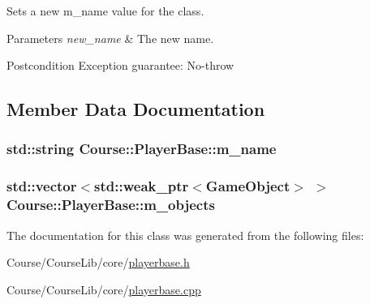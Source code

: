 Sets a new m\-\_\-name value for the class. 


\begin{DoxyParams}{Parameters}
{\em new\-\_\-name} & The new name. \\
\hline
\end{DoxyParams}
\begin{DoxyPostcond}{Postcondition}
Exception guarantee\-: No-\/throw 
\end{DoxyPostcond}


\subsection{Member Data Documentation}
\hypertarget{classCourse_1_1PlayerBase_a9150ef79abdb0ccca8da46c1e51af28e}{
\subsubsection[{m\-\_\-name}]{\setlength{\rightskip}{0pt plus 5cm}std\-::string Course\-::\-Player\-Base\-::m\-\_\-name\hspace{0.3cm}{\ttfamily [private]}}}\label{classCourse_1_1PlayerBase_a9150ef79abdb0ccca8da46c1e51af28e}
\hypertarget{classCourse_1_1PlayerBase_a448c91866b245f8bb3a011835dde19af}{
\subsubsection[{m\-\_\-objects}]{\setlength{\rightskip}{0pt plus 5cm}std\-::vector$<$std\-::weak\-\_\-ptr$<${\bf Game\-Object}$>$ $>$ Course\-::\-Player\-Base\-::m\-\_\-objects\hspace{0.3cm}{\ttfamily [private]}}}\label{classCourse_1_1PlayerBase_a448c91866b245f8bb3a011835dde19af}


The documentation for this class was generated from the following files\-:\begin{DoxyCompactItemize}
\item 
Course/\-Course\-Lib/core/\hyperlink{playerbase_8h}{playerbase.\-h}\item 
Course/\-Course\-Lib/core/\hyperlink{playerbase_8cpp}{playerbase.\-cpp}\end{DoxyCompactItemize}

